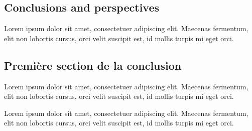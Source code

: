 \begin{bibunit}

\chapter*{Conclusions and perspectives}
\label{chap:conclusions}

Lorem ipsum dolor sit amet, consectetuer adipiscing elit. Maecenas fermentum, elit non lobortis cursus, orci velit suscipit est, id mollis turpis mi eget orci.

\section*{Première section de la conclusion}

Lorem ipsum dolor sit amet, consectetuer adipiscing elit. Maecenas fermentum, elit non lobortis cursus, orci velit suscipit est, id mollis turpis mi eget orci.

Lorem ipsum dolor sit amet, consectetuer adipiscing elit. Maecenas fermentum, elit non lobortis cursus, orci velit suscipit est, id mollis turpis mi eget orci.

\end{bibunit}